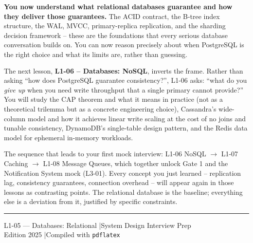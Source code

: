 \documentclass[11pt,a4paper]{article}
\begin{document}
\begin{insightbox}
\textbf{You now understand what relational databases guarantee and how they deliver those guarantees.} The ACID contract, the B-tree index structure, the WAL, MVCC, primary-replica replication, and the sharding decision framework -- these are the foundations that every serious database conversation builds on. You can now reason precisely about when PostgreSQL is the right choice and what its limits are, rather than guessing.

The next lesson, \textbf{L1-06 -- Databases: NoSQL}, inverts the frame. Rather than asking ``how does PostgreSQL guarantee consistency?'', L1-06 asks: ``what do you \emph{give up} when you need write throughput that a single primary cannot provide?'' You will study the CAP theorem and what it means in practice (not as a theoretical trilemma but as a concrete engineering choice), Cassandra's wide-column model and how it achieves linear write scaling at the cost of no joins and tunable consistency, DynamoDB's single-table design pattern, and the Redis data model for ephemeral in-memory workloads.

The sequence that leads to your first mock interview: L1-06 NoSQL $\rightarrow$ L1-07 Caching $\rightarrow$ L1-08 Message Queues, which together unlock Gate 1 and the Notification System mock (L3-01). Every concept you just learned -- replication lag, consistency guarantees, connection overhead -- will appear again in those lessons as contrasting points. The relational database is the baseline; everything else is a deviation from it, justified by specific constraints.
\end{insightbox}

\vspace{1.5cm}
\begin{center}
  {\color{highlight}\rule{0.5\linewidth}{0.6pt}}

  \vspace{0.4cm}
  {\small\color{primary!60}
    L1-05 --- Databases: Relational \quad|\quad System Design Interview Prep\\
    Edition 2025 \quad|\quad Compiled with \texttt{pdflatex}
  }
\end{center}
\end{document}
